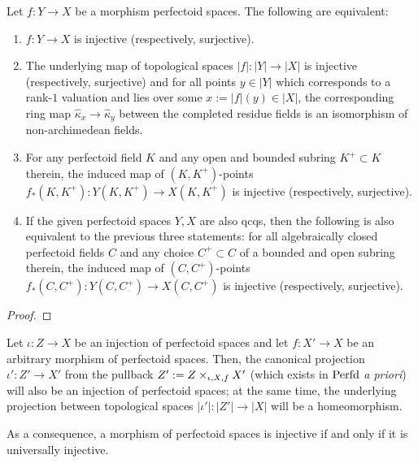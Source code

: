             \begin{proposition} \label{prop: an_injectivity_surjectivity_criterion_for_morphisms_of_perfectoid_sapces}
                \cite[Proposition 5.3]{scholze2021diamond} Let $f: Y \to X$ be a morphism perfectoid spaces. The following are equivalent:
                    \begin{enumerate}
                        \item $f: Y \to X$ is injective (respectively, surjective).
                        \item The underlying map of topological spaces $|f|: |Y| \to |X|$ is injective (respectively, surjective) and for all points $y \in |Y|$ which corresponds to a rank-$1$ valuation and lies over some $x := |f|(y) \in |X|$, the corresponding ring map $\hat{\kappa}_x \to \hat{\kappa}_y$ between the completed residue fields is an isomorphism of non-archimedean fields. 
                        \item For any perfectoid field $K$ and any open and bounded subring $K^+ \subset K$ therein, the induced map of $(K, K^+)$-points $f_*(K, K^+): Y(K, K^+) \to X(K, K^+)$ is injective (respectively, surjective). 
                        \item If the given perfectoid spaces $Y, X$ are also qcqs, then the following is also equivalent to the previous three statements: for all algebraically closed perfectoid fields $C$ and any choice $C^+ \subset C$ of a bounded and open subring therein, the induced map of $(C, C^+)$-points $f_*(C, C^+): Y(C, C^+) \to X(C, C^+)$ is injective (respectively, surjective). 
                    \end{enumerate}
            \end{proposition}
                \begin{proof}
                            
                \end{proof}
            \begin{corollary} \label{coro: injections_are_stable_under_base_changes}
                Let $\iota: Z \to X$ be an injection of perfectoid spaces and let $f: X' \to X$ be an arbitrary morphism of perfectoid spaces. Then, the canonical projection $\iota': Z' \to X'$ from the pullback $Z' := Z \x_{\iota, X, f} X'$ (which exists in $\mathrm{Perfd}$ \textit{a priori}) will also be an injection of perfectoid spaces; at the same time, the underlying projection between topological spaces $|\iota'|: |Z'| \to |X|$ will be a homeomorphism. 
                
                As a consequence, a morphism of perfectoid spaces is injective if and only if it is universally injective.
            \end{corollary}
            
